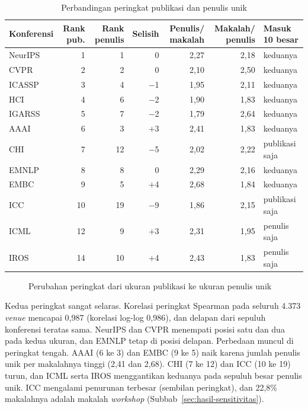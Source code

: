 \begin{table}[ht]
\caption{Perbandingan peringkat publikasi dan penulis unik}
\label{tab:banding}
\footnotesize
\setlength{\tabcolsep}{2.5pt}
\begin{tabular}{@{}lrrrrrl@{}}
\toprule
\textbf{Konferensi} & \textbf{Rank pub.} & \textbf{Rank penulis} & \textbf{Selisih} & \textbf{Penulis/ makalah} & \textbf{Makalah/ penulis} & \textbf{Masuk 10 besar} \\
\midrule
NeurIPS & 1 & 1 & 0 & 2,27 & 2,18 & keduanya \\
CVPR & 2 & 2 & 0 & 2,10 & 2,50 & keduanya \\
ICASSP & 3 & 4 & $-$1 & 1,95 & 2,11 & keduanya \\
HCI & 4 & 6 & $-$2 & 1,90 & 1,83 & keduanya \\
IGARSS & 5 & 7 & $-$2 & 1,79 & 2,64 & keduanya \\
AAAI & 6 & 3 & $+$3 & 2,41 & 1,83 & keduanya \\
CHI & 7 & 12 & $-$5 & 2,02 & 2,22 & publikasi saja \\
EMNLP & 8 & 8 & 0 & 2,29 & 2,16 & keduanya \\
EMBC & 9 & 5 & $+$4 & 2,68 & 1,84 & keduanya \\
ICC & 10 & 19 & $-$9 & 1,86 & 2,15 & publikasi saja \\
ICML & 12 & 9 & $+$3 & 2,31 & 1,95 & penulis saja \\
IROS & 14 & 10 & $+$4 & 2,43 & 1,83 & penulis saja \\
\bottomrule
\end{tabular}
\end{table}

\begin{figure}[ht]
\centering
{}
\caption{Perubahan peringkat dari ukuran publikasi ke ukuran penulis unik}
\label{fig:slope}
\end{figure}

Kedua peringkat sangat selaras. Korelasi peringkat Spearman pada seluruh 4.373 \textit{venue} mencapai 0,987 (korelasi log-log 0,986), dan delapan dari sepuluh konferensi teratas sama. NeurIPS dan CVPR menempati posisi satu dan dua pada kedua ukuran, dan EMNLP tetap di posisi delapan. Perbedaan muncul di peringkat tengah. AAAI (6 ke 3) dan EMBC (9 ke 5) naik karena jumlah penulis unik per makalahnya tinggi (2,41 dan 2,68). CHI (7 ke 12) dan ICC (10 ke 19) turun, dan ICML serta IROS menggantikan keduanya pada sepuluh besar penulis unik. ICC mengalami penurunan terbesar (sembilan peringkat), dan 22,8\% makalahnya adalah makalah \textit{workshop} (Subbab~\ref{sec:hasil-sensitivitas}).

